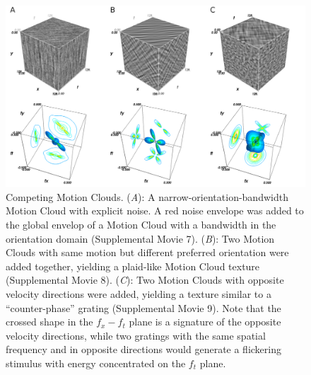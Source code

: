 \documentclass[a4paper,11pt]{article}%
\begin{document}
\begin{figure}%
\includegraphics[width=\textwidth]{figure5}%
	 \caption{Competing Motion Clouds. (\textit{A}): A narrow-orientation-bandwidth Motion Cloud with explicit noise. A red noise envelope was added to the global envelop of a Motion Cloud with a bandwidth in the orientation domain (Supplemental Movie  7). (\textit{B}): Two Motion Clouds with same motion but different preferred orientation were added together, yielding a plaid-like Motion Cloud texture (Supplemental Movie 8). (\textit{C}): Two Motion Clouds with opposite velocity directions were added, yielding a texture similar to a ``counter-phase'' grating (Supplemental Movie 9). Note that the crossed shape in the $f_x-f_t$ plane is a signature of the opposite velocity directions, while two gratings with the same spatial frequency and in opposite directions would generate a flickering stimulus with energy concentrated on the $f_t$ plane.} %
	 \label{fig:counterphase} %
\end{figure} %
\end{document}
